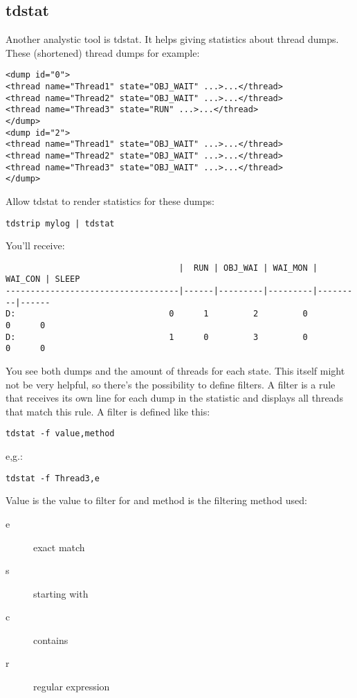 \subsection{tdstat}

Another analystic tool is tdstat.
It helps giving statistics about thread dumps.
These (shortened) thread dumps for example:
\begin{lstlisting}
<dump id="0">
<thread name="Thread1" state="OBJ_WAIT" ...>...</thread>
<thread name="Thread2" state="OBJ_WAIT" ...>...</thread>
<thread name="Thread3" state="RUN" ...>...</thread>
</dump>
<dump id="2">
<thread name="Thread1" state="OBJ_WAIT" ...>...</thread>
<thread name="Thread2" state="OBJ_WAIT" ...>...</thread>
<thread name="Thread3" state="OBJ_WAIT" ...>...</thread>
</dump>
\end{lstlisting}

Allow tdstat to render statistics for these dumps:
\begin{lstlisting}
tdstrip mylog | tdstat
\end{lstlisting}

You'll receive:
\begin{lstlisting}
                                   |  RUN | OBJ_WAI | WAI_MON | WAI_CON | SLEEP
-----------------------------------|------|---------|---------|---------|------
D:                               0      1         2         0         0      0
D:                               1      0         3         0         0      0
\end{lstlisting}

You see both dumps and the amount of threads for each state.
This itself might not be very helpful, so there's the possibility to define filters.
A filter is a rule that receives its own line for each dump in the statistic and displays all threads that match this rule.
A filter is defined like this:
\begin{lstlisting}
tdstat -f value,method
\end{lstlisting}

e,g.:
\begin{lstlisting}
tdstat -f Thread3,e
\end{lstlisting}

Value is the value to filter for and method is the filtering method used:
\begin{description}
\item[e] exact match
\item[s] starting with
\item[c] contains
\item[r] regular expression
\end{description}

